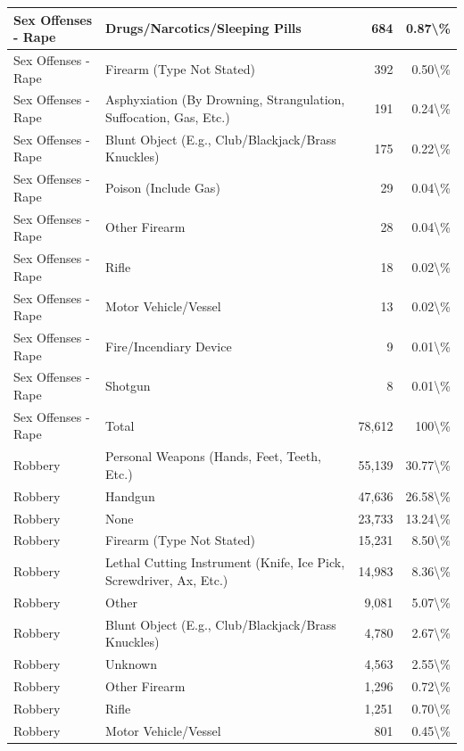 \documentclass[
]{krantz}
\begin{document}
\begin{longtable}[t]{l|l|r|r}
\hline
Sex Offenses - Rape & Drugs/Narcotics/Sleeping Pills & 684 & 0.87\textbackslash{}\%\\
\hline
Sex Offenses - Rape & Firearm (Type Not Stated) & 392 & 0.50\textbackslash{}\%\\
\hline
Sex Offenses - Rape & Asphyxiation (By Drowning, Strangulation, Suffocation, Gas, Etc.) & 191 & 0.24\textbackslash{}\%\\
\hline
Sex Offenses - Rape & Blunt Object (E.g., Club/Blackjack/Brass Knuckles) & 175 & 0.22\textbackslash{}\%\\
\hline
Sex Offenses - Rape & Poison (Include Gas) & 29 & 0.04\textbackslash{}\%\\
\hline
Sex Offenses - Rape & Other Firearm & 28 & 0.04\textbackslash{}\%\\
\hline
Sex Offenses - Rape & Rifle & 18 & 0.02\textbackslash{}\%\\
\hline
Sex Offenses - Rape & Motor Vehicle/Vessel & 13 & 0.02\textbackslash{}\%\\
\hline
Sex Offenses - Rape & Fire/Incendiary Device & 9 & 0.01\textbackslash{}\%\\
\hline
Sex Offenses - Rape & Shotgun & 8 & 0.01\textbackslash{}\%\\
\hline
Sex Offenses - Rape & Total & 78,612 & 100\textbackslash{}\%\\
\hline
Robbery & Personal Weapons (Hands, Feet, Teeth, Etc.) & 55,139 & 30.77\textbackslash{}\%\\
\hline
Robbery & Handgun & 47,636 & 26.58\textbackslash{}\%\\
\hline
Robbery & None & 23,733 & 13.24\textbackslash{}\%\\
\hline
Robbery & Firearm (Type Not Stated) & 15,231 & 8.50\textbackslash{}\%\\
\hline
Robbery & Lethal Cutting Instrument (Knife, Ice Pick, Screwdriver, Ax, Etc.) & 14,983 & 8.36\textbackslash{}\%\\
\hline
Robbery & Other & 9,081 & 5.07\textbackslash{}\%\\
\hline
Robbery & Blunt Object (E.g., Club/Blackjack/Brass Knuckles) & 4,780 & 2.67\textbackslash{}\%\\
\hline
Robbery & Unknown & 4,563 & 2.55\textbackslash{}\%\\
\hline
Robbery & Other Firearm & 1,296 & 0.72\textbackslash{}\%\\
\hline
Robbery & Rifle & 1,251 & 0.70\textbackslash{}\%\\
\hline
Robbery & Motor Vehicle/Vessel & 801 & 0.45\textbackslash{}\%\\

\end{longtable}
\end{document}
